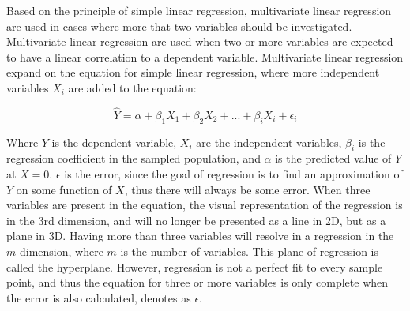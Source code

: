 

Based on the principle of simple linear regression, multivariate linear regression are used in cases where more that two variables should be investigated. Multivariate linear regression are used when two or more variables are expected to have a linear correlation to a dependent variable. %
Multivariate linear regression expand on the equation for simple linear regression, where more independent variables $X_i$ are added to the equation: \cite{zar2009}

\begin{equation} \label{eq:multiLinearRegression}
\hat{Y} = \alpha + \beta_1 X_{1} + \beta_2 X_{2} + ... + \beta_i X_{i} + \epsilon_i
\end{equation}

Where $Y$ is the dependent variable, $X_i$ are the independent variables, $\beta_i$ is the regression coefficient in the sampled population, and $\alpha$ is the predicted value of $Y$ at $X = 0$. $\epsilon$ is the error, since the goal of regression is to find an approximation of $Y$ on some function of $X$, thus there will always be some error.
When three variables are present in the equation, the visual representation of the regression is in the 3rd dimension, and will no longer be presented as a line in 2D, but as a plane in 3D. Having more than three variables will resolve in a regression in the $m$-dimension, where $m$ is the number of variables. This plane of regression is called the hyperplane. However, regression is not a perfect fit to every sample point, and thus the equation for three or more variables is only complete when the error is also calculated, denotes as $\epsilon$.


